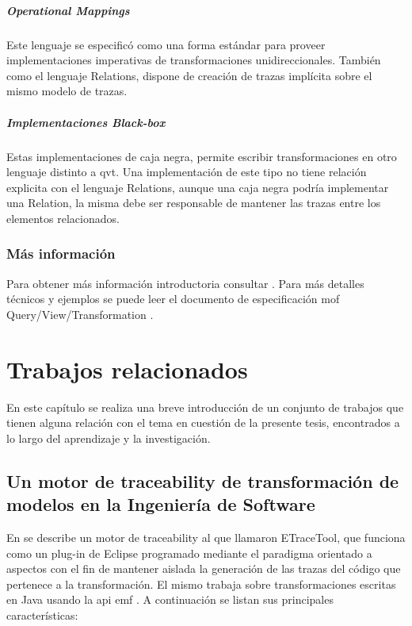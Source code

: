 \documentclass[a4paper,12pt,oneside,spanish]{book}
\begin{document}
\paragraph{Operational Mappings}

Este lenguaje se especificó como una forma estándar para proveer implementaciones imperativas de transformaciones unidireccionales. También como el lenguaje Relations, dispone de creación de trazas implícita sobre el mismo modelo de trazas.


\paragraph{Implementaciones Black-box}

Estas implementaciones de caja negra, permite escribir transformaciones en otro lenguaje distinto a \gls{qvt}. Una implementación de este tipo no tiene
relación explicita con el lenguaje Relations, aunque una caja negra podría implementar una Relation, la misma debe ser responsable de mantener las trazas entre los elementos relacionados.


\subsection{Más información}

Para obtener más información introductoria consultar \cite{DSDPM}. Para más detalles técnicos y ejemplos se puede leer el documento de especificación \gls{mof} Query/View/Transformation \cite{QVT}.




\chapter{Trabajos relacionados}

En este capítulo se realiza una breve introducción de un conjunto de trabajos que tienen alguna relación con el tema en cuestión de la presente tesis, encontrados a lo largo del aprendizaje y la investigación.

\section{Un motor de traceability de transformación de modelos en la Ingeniería de Software}

En \cite{AmarLeblancCoulette} se describe un motor de traceability al que llamaron ETraceTool, que funciona como un plug-in de Eclipse programado mediante el paradigma orientado a aspectos con el fin de mantener aislada la generación de las trazas del código que pertenece a la transformación. El mismo trabaja sobre transformaciones escritas en Java usando la \gls{api} \gls{emf} \cite{EMF}. A continuación se listan sus principales características:
\end{document}
